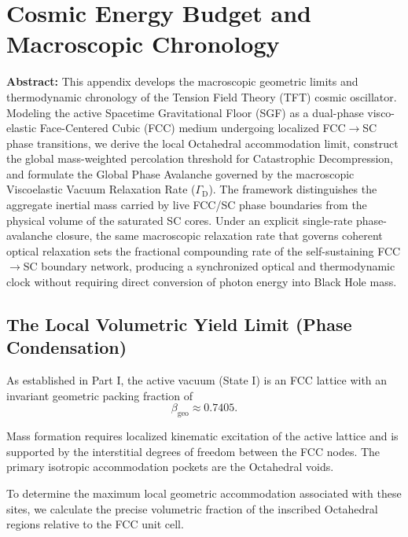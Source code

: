 \chapter{Cosmic Energy Budget and Macroscopic Chronology}
\label{app:energy_and_chronology}

\noindent\textbf{Abstract:} This appendix develops the macroscopic geometric limits and thermodynamic chronology of the Tension Field Theory (TFT) cosmic oscillator. Modeling the active Spacetime Gravitational Floor (SGF) as a dual-phase visco-elastic Face-Centered Cubic (FCC) medium undergoing localized FCC$\rightarrow$SC phase transitions, we derive the local Octahedral accommodation limit, construct the global mass-weighted percolation threshold for Catastrophic Decompression, and formulate the Global Phase Avalanche governed by the macroscopic Viscoelastic Vacuum Relaxation Rate ($\Gamma_{\mathrm{D}}$). The framework distinguishes the aggregate inertial mass carried by live FCC/SC phase boundaries from the physical volume of the saturated SC cores. Under an explicit single-rate phase-avalanche closure, the same macroscopic relaxation rate that governs coherent optical relaxation sets the fractional compounding rate of the self-sustaining FCC$\rightarrow$SC boundary network, producing a synchronized optical and thermodynamic clock without requiring direct conversion of photon energy into Black Hole mass.

\section{The Local Volumetric Yield Limit (Phase Condensation)}

As established in Part I, the active vacuum (State I) is an FCC lattice with an invariant geometric packing fraction of
\begin{equation}
    \beta_{\mathrm{geo}} \approx 0.7405.
\end{equation}

Mass formation requires localized kinematic excitation of the active lattice and is supported by the interstitial degrees of freedom between the FCC nodes. The primary isotropic accommodation pockets are the Octahedral voids.

To determine the maximum local geometric accommodation associated with these sites, we calculate the precise volumetric fraction of the inscribed Octahedral regions relative to the FCC unit cell.

